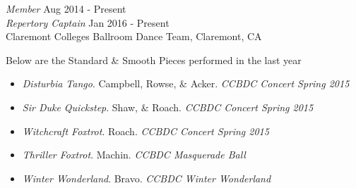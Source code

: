 {\sl Member} \hfill Aug 2014 - Present \\
{\sl Repertory Captain} \hfill Jan 2016 - Present \\
Claremont Colleges Ballroom Dance Team, Claremont, CA

Below are the Standard \& Smooth Pieces performed in the last
year
\begin{itemize} \itemsep -2pt
  \item \textit{Disturbia Tango}. Campbell, Rowse, \& Acker. \textit{CCBDC Concert Spring 2015}
  \item \textit{Sir Duke Quickstep}. Shaw, \& Roach. \textit{CCBDC Concert Spring 2015}
  \item \textit{Witchcraft Foxtrot}. Roach.  \textit{CCBDC Concert Spring 2015}
  \item \textit{Thriller Foxtrot}. Machin. \textit{CCBDC Masquerade Ball}
  \item \textit{Winter Wonderland}. Bravo. \textit{CCBDC Winter Wonderland}
\end{itemize}
